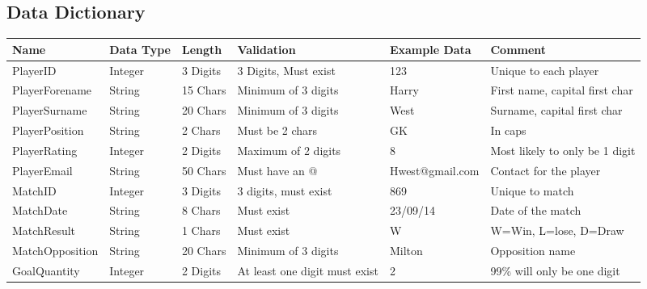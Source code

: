 \begin{itemize}
\subsection{Data Dictionary}
\begin{table}[H]
\centering
\begin{tabular}{|l|l|l|l|l|l|} 
\hline
Name            & Data Type & Length   & Validation                    & Example Data    & Comment                        \\ \hline
PlayerID        & Integer   & 3 Digits & 3 Digits, Must exist          & 123             & Unique to each player          \\ \hline
PlayerForename  & String    & 15 Chars & Minimum of 3 digits           & Harry           & First name, capital first char \\ \hline
PlayerSurname   & String    & 20 Chars & Minimum of 3 digits           & West            & Surname, capital first char    \\ \hline
PlayerPosition  & String    & 2 Chars  & Must be 2 chars               & GK              & In caps                        \\ \hline
PlayerRating    & Integer   & 2 Digits & Maximum of 2 digits           & 8               & Most likely to only be 1 digit \\ \hline
PlayerEmail     & String    & 50 Chars & Must have an @                & Hwest@gmail.com & Contact for the player         \\ \hline
MatchID         & Integer   & 3 Digits & 3 digits, must exist          & 869             & Unique to match                \\ \hline
MatchDate       & String    & 8 Chars  & Must exist                    & 23/09/14        & Date of the match              \\ \hline
MatchResult     & String    & 1 Chars  & Must exist                    & W               & W=Win, L=lose, D=Draw          \\ \hline
MatchOpposition & String    & 20 Chars & Minimum of 3 digits           & Milton          & Opposition name                \\ \hline
GoalQuantity    & Integer   & 2 Digits & At least one digit must exist & 2               & 99\% will only be one digit    \\ \hline
\end{tabular}
\end{table}

\end{itemize}
